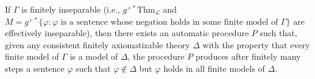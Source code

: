 If $\Gamma$ is finitely inseparable (i.e., $g^{+*} \text{Thm}_{\mathcal{L}}$ and $M = g^{+*} \{ \varphi : \varphi \text{ is a sentence whose negation holds in some finite model of } \Gamma \}$ are effectively inseparable), then there exists an automatic procedure $P$ such that, given any consistent finitely axiomatizable theory $\Delta$ with the property that every finite model of $\Gamma$ is a model of $\Delta$, the procedure $P$ produces after finitely many steps a sentence $\varphi$ such that $\varphi \notin \Delta$ but $\varphi$ holds in all finite models of $\Delta$.
